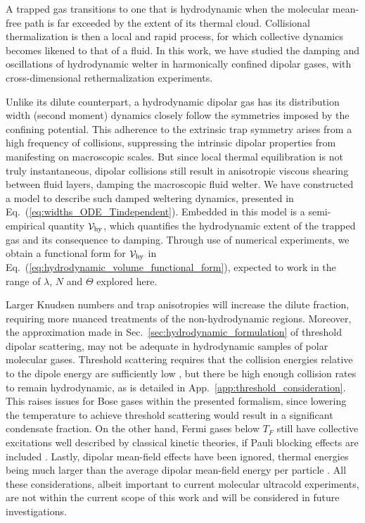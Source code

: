 \documentclass[reprint, amsmath, amssymb, aps, superscriptaddress]{revtex4-1}
\begin{document}
A trapped gas transitions to one that is hydrodynamic when the molecular mean-free path is far exceeded by the extent of its thermal cloud. 
Collisional thermalization is then a local and rapid process, for which collective dynamics becomes likened to that of a fluid. 
In this work, we have studied the damping and oscillations of hydrodynamic welter in harmonically confined dipolar gases, with cross-dimensional rethermalization experiments.


Unlike its dilute counterpart, a hydrodynamic dipolar gas has its distribution width (second moment) dynamics closely follow the symmetries imposed by the confining potential. This adherence to the extrinsic trap symmetry arises from a high frequency of collisions, suppressing the intrinsic dipolar properties from manifesting on macroscopic scales.  
But since local thermal equilibration is not truly instantaneous, dipolar collisions still result in anisotropic viscous shearing between fluid layers, damping the macroscopic fluid welter.  
We have constructed a model to describe such damped weltering dynamics, presented in Eq.~(\ref{eq:widths_ODE_Tindependent}). Embedded in this model is a semi-empirical quantity ${\cal V}_{\rm hy}$, which quantifies the hydrodynamic extent of the trapped gas and its consequence to damping. Through use of numerical experiments, we obtain a functional form for ${\cal V}_{\rm hy}$ in Eq.~(\ref{eq:hydrodynamic_volume_functional_form}), expected to work in the range of $\lambda$, $N$ and $\Theta$ explored here.

 
Larger Knudsen numbers and trap anisotropies will increase the dilute fraction, requiring more nuanced treatments of the non-hydrodynamic regions.
Moreover, the approximation made in Sec.~\ref{sec:hydrodynamic_formulation} of threshold dipolar scattering, may not be adequate in hydrodynamic samples of polar molecular gases. Threshold scattering requires that the collision energies relative to the dipole energy are sufficiently low \cite{Bohn09_NJP}, but there be high enough collision rates to remain hydrodynamic, as is detailed in App.~\ref{app:threshold_consideration}. This raises issues for Bose gases within the presented formalism, since lowering the temperature to achieve threshold scattering would result in a significant condensate fraction. On the other hand, Fermi gases below $T_F$ still have collective excitations well described by classical kinetic theories, if Pauli blocking effects are included \cite{Nikuni98_JLTP}. 
Lastly, dipolar mean-field effects have been ignored, thermal energies being much larger than the average dipolar mean-field energy per particle \cite{Lahaye09_IOP}. 
All these considerations, albeit important to current molecular ultracold experiments, are not within the current scope of this work and will be considered in future investigations. 
\end{document}
